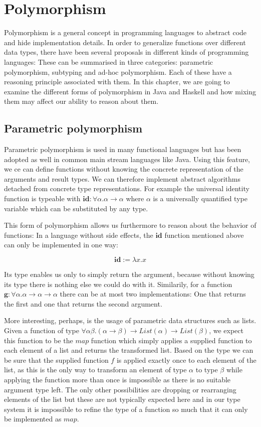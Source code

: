 \chapter{Polymorphism}
\label{ch:polymorphism}

Polymorphism is a general concept in programming languages to abstract code and hide implementation details.
In order to generalize functions over different data types, there have been several proposals in different kinds of programming languages:
These can be summarised in three categories: parametric polymorphism, subtyping and ad-hoc polymorphism.
Each of these have a reasoning principle associated with them.
In this chapter, we are going to examine the different forms of polymorphism in Java and Haskell and how mixing them may affect our ability to reason about them.

\section{Parametric polymorphism}\label{sec:parmetric-polymorphism}

Parametric polymorphism is used in many functional languages but has been adopted as well in common main stream languages like Java.
Using this feature, we ce can define functions without knowing the concrete representation of the arguments and result types.
We can therefore implement abstract algorithms detached from concrete type representations.
For example the universal identity function is typeable with $\mathbf{id} : \forall \alpha. \alpha \to \alpha$ where $\alpha$ is a universally quantified type variable which can be substituted by any type.

This form of polymorphism allows us furthermore to reason about the behavior of functions:
In a language without side effects, the $\mathbf{id}$ function mentioned above can only be implemented in one way:

$$
  \mathbf{id} := \lambda x.x
$$

Its type enables us only to simply return the argument, because without knowing its type there is nothing else we could do with it.
Similarily, for a function $\mathbf{g} : \forall \alpha. \alpha \to \alpha \to \alpha$ there can be at most two implementations:
One that returns the first and one that returns the second argument.

More interesting, perhaps, is the usage of parametric data structures such as lists.
Given a function of type $\forall \alpha \beta. (\alpha \to \beta) \to \mathit{List}(\alpha) \to \mathit{List}(\beta)$, we expect this function to be the $\mathit{map}$ function which simply applies a supplied function to each element of a list and returns the transformed list.
Based on the type we can be sure that the supplied function $f$ is applied exactly once to each element of the list, as this is the only way to transform an element of type $\alpha$ to type $\beta$ while applying the function more than once is impossible as there is no suitable argument type left.
The only other possibilities are dropping or rearranging elements of the list but these are not typically expected here and in our type system it is impossible to refine the type of a function so much that it can only be implemented as $\mathit{map}$.

